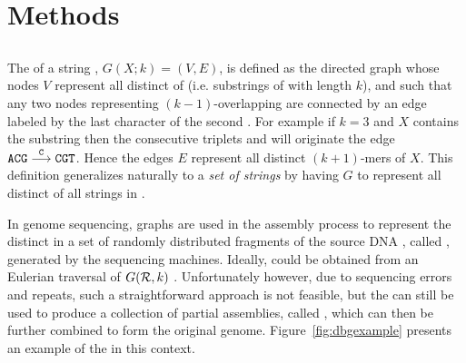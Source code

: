 \chapter{Methods}


\section{}


The  of a string , $G(X;k)=(V,E)$, is defined as the directed graph whose nodes $V$ represent all distinct  of  (i.e. substrings of  with length $k$), and such that any two nodes representing $(k-1)$-overlapping \kmers are connected by an edge labeled by the last character of the second \kmer. For example if $k=3$ and $X$ contains the substring  then the consecutive triplets  and  will originate the edge $\mathtt{ACG}\stackrel{\mathtt{C}}{\longrightarrow}\mathtt{CGT}$. Hence the edges $E$ represent all distinct $(k+1)$-mers of $X$. 
This definition generalizes naturally to a \emph{set of strings}  by having $G$ to represent all distinct  of all strings in .

In genome sequencing, \dB graphs are used in the assembly process to represent the distinct \kmers in a set \readset of randomly distributed fragments of the source DNA , called , generated by the sequencing machines. Ideally,  could be obtained from an Eulerian traversal of $G(\readset, k)$ \cite{Pevzner2001}. Unfortunately however, due to sequencing errors and repeats, such a straightforward approach is not feasible, but the \dBG can still be used to produce a collection of partial assemblies, called , which can then be further combined to form the original genome. Figure~\ref{fig:dbgexample} presents an example of the \dBG in this context.

